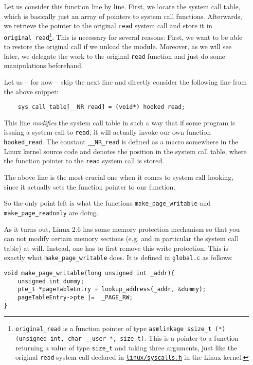 \documentclass[10pt, letterpaper]{scrartcl}
\begin{document}
Let us consider this function line by line. First, we locate the system call table, which is basically just an array of pointers to system call functions. Afterwards, we retrieve the pointer to the original \texttt{read} system call and store it in  \texttt{original\_read}\footnote{\texttt{original\_read} is a function pointer of type \texttt{asmlinkage ssize\_t (*)(unsigned int, char \_\_user *, size\_t)}. This is a pointer to a function returning a value of type \texttt{size\_t} and taking three arguments, just like the original \texttt{read} system call declared in \href{http://lxr.linux.no/linux+v2.6.32/arch/x86/include/asm/syscalls.h}{\texttt{linux/syscalls.h}} in the Linux kernel.}. This is necessary for several reasons: First, we want to be able to restore the original call if we unload the module. Moreover, as we will see later, we delegate the work to the original \texttt{read} function and just do some manipulations beforehand.

Let us -- for now -- skip the next line and directly consider the following line from the above snippet:

\begin{verbatim}
    sys_call_table[__NR_read] = (void*) hooked_read;
\end{verbatim}

This line \emph{modifies} the system call table in such a way that if some program is issuing a system call to \texttt{read}, it will actually invoke our own function \texttt{hooked\_read}. The constant \texttt{\_\_NR\_read} is defined as a macro somewhere in the Linux kernel source code and denotes the position in the system call table, where the function pointer to the \texttt{read} system call is stored.

The above line is the most crucial one when it comes to system call hooking, since it actually sets the function pointer to our function.

So the only point left is what the functions \texttt{make\_page\_writable} and \texttt{make\_page\_readonly} are doing.

As it turns out, Linux 2.6 has some memory protection mechanism so that you can not modify certain memory sections (e.g. and in particular the system call table) at will. Instead, one has to first remove this write protection. This is exactly what \texttt{make\_page\_writable} does. It is defined in \texttt{global.c} as follows:

\begin{verbatim}
void make_page_writable(long unsigned int _addr){
    unsigned int dummy;
    pte_t *pageTableEntry = lookup_address(_addr, &dummy);
    pageTableEntry->pte |=  _PAGE_RW;
}
\end{verbatim}
\end{document}
